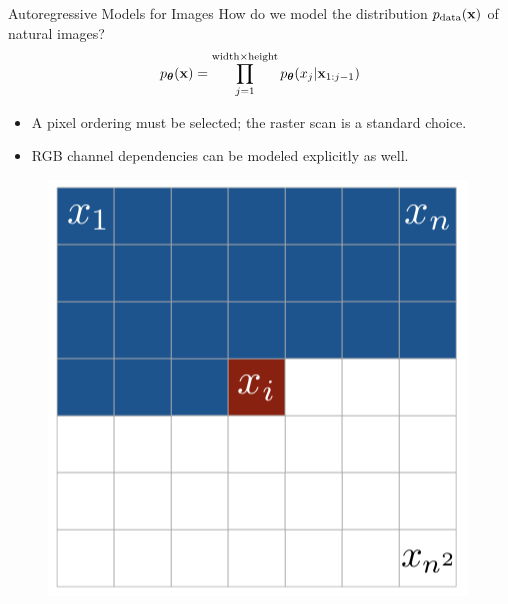 \documentclass{beamer}
\begin{document}
\begin{frame}{Autoregressive Models for Images}
	How do we model the distribution $p_{\text{data}}(\mathbf{x})$ of natural images?
	$$
  		p_{\boldsymbol{\theta}}(\mathbf{x}) = \prod_{j=1}^{\text{width} \times \text{height}} p_{\boldsymbol{\theta}}(x_j | \mathbf{x}_{1:j-1})
	$$
    \eqpause
	\begin{minipage}[t]{0.5\columnwidth}
		\vspace{0.5cm}
		\begin{itemize}
			\item A pixel ordering must be selected; the raster scan is a standard choice.
			\vfill
		    \item RGB channel dependencies can be modeled explicitly as well.
		\end{itemize}
	\end{minipage}%
	\begin{minipage}[t]{0.5\columnwidth}
		\begin{figure}
			\centering
   			\includegraphics[width=0.9\linewidth]{figs/pixelcnn1.png}
		\end{figure}
	\end{minipage}
\end{frame}
\end{document}
